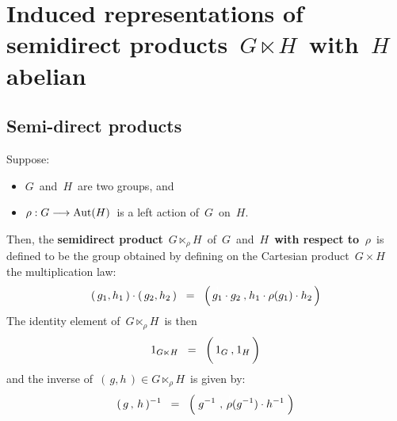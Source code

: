 

\chapter{Induced representations of semidirect products \,$G \ltimes\! H$\, with \,$H$\, abelian}
\setcounter{theorem}{0}
\setcounter{equation}{0}


\renewcommand{\theenumi}{\roman{enumi}}
\renewcommand{\labelenumi}{\textnormal{(\theenumi)}$\;\;$}


\section{Semi-direct products}

\begin{definition}
\mbox{}
\vskip 0.1cm
\noindent
Suppose:
\begin{itemize}
\item
	$G$\, and \,$H$\, are two groups, and
\item
	$\rho : G \longrightarrow \textnormal{Aut}(H)$\,
	is a left action of \,$G$\, on \,$H$.\,
\end{itemize}
Then, the \textbf{semidirect product} \,$G \ltimes_{\rho}\! H$\,
of \,$G$\, and \,$H$\, \textbf{\color{red}with respect to \,$\rho$}\,
is defined to be the group
obtained by defining on the Cartesian product
\,$G \times H$\,
the multiplication law:
\begin{equation*}
(\,g_{1},h_{1}\,) \cdot (\,g_{2},h_{2}\,)
\;\; = \;\;
	\left(\,
		\overset{{\color{white}1}}{g_{1}} \cdot g_{2}
		\,\overset{{\color{white}1}}{,}\,
		h_{1} \cdot \rho(g_{1}) \cdot h_{2}
		\,\right)
\end{equation*}
The identity element of \,$G \ltimes_{\rho}\! H$\, is then
\begin{equation*}
1_{G \ltimes H}
\;\; = \;\;
	\left(\,
		\overset{{\color{white}1}}{1_{G}}
		\,\overset{{\color{white}1}}{,}\,
		1_{H}
		\,\right)
\end{equation*}
and the inverse of \,$(\,g,h\,) \in G \ltimes_{\rho}\! H$\, is given by:
\begin{equation*}
(\, g \,,\, h \,)^{-1}
\;\; = \;\;
	\left(\;
		g^{-1}
		\;\overset{{\color{white}1}}{,}\;
		\overset{{\color{white}1}}{\rho}(g^{-1}) \cdot h^{-1}
		\;\right)
\end{equation*}
\end{definition}

